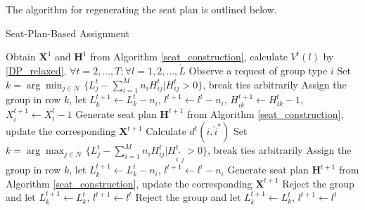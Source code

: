 The algorithm for regenerating the seat plan is outlined below.

\begin{algorithm}[H]
  \caption{Seat-Plan-Based Assignment}
  Obtain $\bm{X}^{1}$ and $\bm{H}^{1}$ from Algorithm \ref{seat_construction}, calculate $V^{t}(l)$ by \eqref{DP_relaxed}, $\forall t =2, \ldots, T; \forall l = 1,2, \ldots, \tilde{L}$\;
  {Observe a request of group type ${i}$\;
    {
    {Set $k = \arg \min_{j \in \mathcal{N}} \{L_j^{t} - \sum_{i=1}^{M} n_i H^{t}_{ij}|H^{t}_{ij} >0\}$, break ties arbitrarily\; 
     Assign the group in row $k$, let $L_{k}^{t+1} \gets L_{k}^{t}- n_{i}$, $l^{t+1} \gets l^{t}-n_{i}$, $H_{ik}^{t+1} \gets H_{ik}^{t}-1$, $X_{i}^{t+1}\gets X_{i}^{t}-1$\;
    {Generate seat plan $\bm{H}^{t+1}$ from Algorithm \ref{seat_construction}, update the corresponding $\bm{X}^{t+1}$\;}}
    {Calculate $d^{t}({i}, \hat{i}^{*})$\;
    {Set $k = \arg \max_{j \in \mathcal{N}} \{L_j^{t} - \sum_{i=1}^{M} n_i H_{ij}^{t}|H_{\hat{i}^{*} j}^{t} >0\}$, break ties arbitrarily\;
     Assign the group in row $k$, let $L_{k}^{t+1} \gets L_{k}^{t}- n_{i}$, $l^{t+1} \gets l^{t}-n_{i}$\;
    Generate seat plan $\bm{H}^{t+1}$ from Algorithm \ref{seat_construction}, update the corresponding $\bm{X}^{t+1}$\;}
    {Reject the group and let $L_{k}^{t+1} \gets L_{k}^{t}$, $l^{t+1} \gets l^{t}$\;}}}
    {Reject the group and let $L_{k}^{t+1} \gets L_{k}^{t}$, $l^{t+1} \gets l^{t}$\;}}
\end{algorithm}

